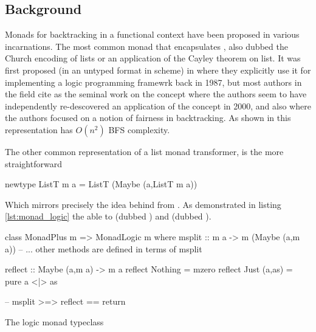 \subsection{Background}

Monads for backtracking in a functional context have been proposed in
various incarnations.  The most common monad that encapsulates
, also
dubbed the Church encoding of lists or an application of the Cayley
theorem on list. It was first proposed (in an untyped format in
scheme) in \cite{haynesLogicContinuations1987} where they explicitly
use it for implementing a logic programming framewrk back in 1987, but
most authors in the field cite
\cite{hinzeDerivingBacktrackingMonad2000a} as the seminal work on the
concept where the authors seem to have independently re-descovered an
application of the concept in 2000, and also
\cite{kiselyovBacktrackingInterleavingTerminating} where the authors
focused on a notion of fairness in backtracking. As shown in
\cite{kidneyAlgebrasWeightedSearch2021} this representation has
\(O(n^2)\) BFS complexity.

The other common representation of a list monad transformer, is the more
straightforward

\begin{haskellcode}
newtype ListT m a = ListT (Maybe (a,ListT m a))
\end{haskellcode}

Which mirrors precisely the idea behind  from
\cite{kiselyovBacktrackingInterleavingTerminating}. As demonstrated in
listing \ref{lst:monad_logic} the  able to
 (dubbed ) and  (dubbed
).

\begin{code}
\begin{haskellcode}
class MonadPlus m => MonadLogic m where
  msplit :: m a -> m (Maybe (a,m a))
  -- ... other methods are defined in terms of msplit

reflect :: Maybe (a,m a) -> m a
reflect Nothing = mzero
reflect Just (a,as) = pure a <|> as

-- msplit >=> reflect == return
\end{haskellcode}
  \caption{\label{lst:monad_logic}The logic monad typeclass}
\end{code}


